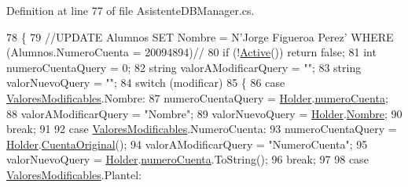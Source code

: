 Definition at line 77 of file Asistente\-D\-B\-Manager.\-cs.


\begin{DoxyCode}
78         \{
79             \textcolor{comment}{//UPDATE Alumnos SET Nombre = N'Jorge Figueroa Perez' WHERE (Alumnos.NumeroCuenta = 20094894)//}
80             \textcolor{keywordflow}{if} (!\hyperlink{class_asistencias__wpf_1_1_asistente_d_b_manager_ae48d582f5f9db4788e0f5f7c1bfe9b6e}{Active}()) \textcolor{keywordflow}{return} \textcolor{keyword}{false};
81             \textcolor{keywordtype}{int} numeroCuentaQuery = 0;
82             \textcolor{keywordtype}{string} valorAModificarQuery = \textcolor{stringliteral}{""};
83             \textcolor{keywordtype}{string} valorNuevoQuery = \textcolor{stringliteral}{""};
84             \textcolor{keywordflow}{switch} (modificar)
85             \{
86                 \textcolor{keywordflow}{case} \hyperlink{class_asistencias__wpf_1_1_asistente_d_b_manager_aeae46a91b8b2adb28f456244aacfb8f0}{ValoresModificables}.Nombre:
87                     numeroCuentaQuery = \hyperlink{class_asistencias__wpf_1_1_asistente_d_b_manager_a4f73db2d92f913ccc8862126717968cd}{Holder}.\hyperlink{class_asistencias__wpf_1_1_asistente_a6d2aa009497445d62699e3c9d402ca78}{numeroCuenta};
88                     valorAModificarQuery = \textcolor{stringliteral}{"Nombre"};
89                     valorNuevoQuery = \hyperlink{class_asistencias__wpf_1_1_asistente_d_b_manager_a4f73db2d92f913ccc8862126717968cd}{Holder}.\hyperlink{class_asistencias__wpf_1_1_asistente_a321714ee92e497c61236fedca32912cb}{Nombre};
90                     \textcolor{keywordflow}{break};
91 
92                 \textcolor{keywordflow}{case} \hyperlink{class_asistencias__wpf_1_1_asistente_d_b_manager_aeae46a91b8b2adb28f456244aacfb8f0}{ValoresModificables}.NumeroCuenta:
93                     numeroCuentaQuery = \hyperlink{class_asistencias__wpf_1_1_asistente_d_b_manager_a4f73db2d92f913ccc8862126717968cd}{Holder}.\hyperlink{class_asistencias__wpf_1_1_asistente_a0b2aea45dc518be02f9f506176993342}{CuentaOriginal}();
94                     valorAModificarQuery = \textcolor{stringliteral}{"NumeroCuenta"};
95                     valorNuevoQuery = \hyperlink{class_asistencias__wpf_1_1_asistente_d_b_manager_a4f73db2d92f913ccc8862126717968cd}{Holder}.\hyperlink{class_asistencias__wpf_1_1_asistente_a6d2aa009497445d62699e3c9d402ca78}{numeroCuenta}.ToString();
96                     \textcolor{keywordflow}{break};
97 
98                 \textcolor{keywordflow}{case} \hyperlink{class_asistencias__wpf_1_1_asistente_d_b_manager_aeae46a91b8b2adb28f456244aacfb8f0}{ValoresModificables}.Plantel:

\end{DoxyCode}
